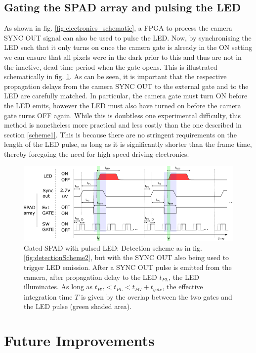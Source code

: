 \documentclass[]{article}
\begin{document}
\subsection{Gating the SPAD array and pulsing the LED} \label{gatedSPADandLED}

	As shown in fig. \ref{fig:electronics_schematic}, a FPGA to process the camera SYNC OUT signal can also be used to pulse the LED. Now, by synchronising the LED such that it only turns on once the camera gate is already in the ON setting we can ensure that all pixels were in the dark prior to this and thus are not in the inactive, dead time period when the gate opens. This is illustrated schematically in fig. \ref{fig:detectionScheme3b}. As can be seen, it is important that the respective propagation delays from the camera SYNC OUT to the external gate and to the LED are carefully matched. In particular, the camera gate must turn ON before the LED emits, however the LED must also have turned on before the camera gate turns OFF again. While this is doubtless one experimental difficulty, this method is nonetheless more practical and less costly than the one described in section \ref{scheme1}. This is because there are no stringent requirements on the length of the LED pulse, as long as it is significantly shorter than the frame time, thereby foregoing the need for high speed driving electronics.
	
		\begin{figure}
			\centering
			\includegraphics[width=0.7\linewidth]{Figures/detectionScheme3b}
			\caption{Gated SPAD with pulsed LED: Detection scheme as in fig. \ref{fig:detectionScheme2}, but with the SYNC OUT also being used to trigger LED emission. After a SYNC OUT pulse is emitted from the camera, after propagation delay to the LED $t_{PL}$, the LED illuminates. As long as $t_{PG}<t_{PL}<t_{PG}+t_{gate}$, the effective integration time $T$ is given by the overlap between the two gates and the LED pulse (green shaded area).}
			\label{fig:detectionScheme3b}
		\end{figure}

\section{Future Improvements}
	
\end{document}
